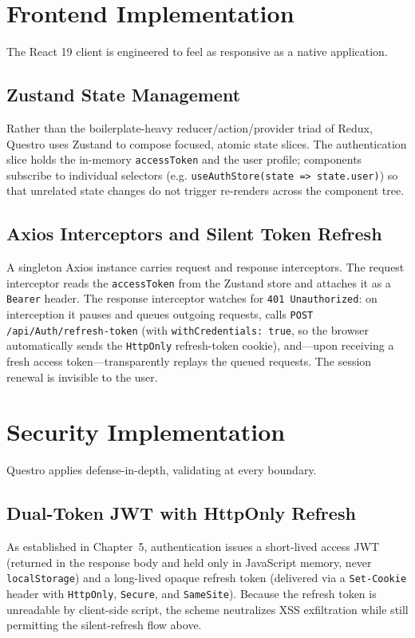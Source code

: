 \section{Frontend Implementation}
The React 19 client is engineered to feel as responsive as a native application.

\subsection{Zustand State Management}
Rather than the boilerplate-heavy reducer/action/provider triad of Redux, Questro uses Zustand to compose focused, atomic state slices. The authentication slice holds the in-memory \texttt{accessToken} and the user profile; components subscribe to individual selectors (e.g. \texttt{useAuthStore(state => state.user)}) so that unrelated state changes do not trigger re-renders across the component tree.

\subsection{Axios Interceptors and Silent Token Refresh}
A singleton Axios instance carries request and response interceptors. The request interceptor reads the \texttt{accessToken} from the Zustand store and attaches it as a \texttt{Bearer} header. The response interceptor watches for \texttt{401 Unauthorized}: on interception it pauses and queues outgoing requests, calls \texttt{POST /api/Auth/refresh-token} (with \texttt{withCredentials: true}, so the browser automatically sends the \texttt{HttpOnly} refresh-token cookie), and---upon receiving a fresh access token---transparently replays the queued requests. The session renewal is invisible to the user.

\section{Security Implementation}
\label{sec:security_impl}
Questro applies defense-in-depth, validating at every boundary.

\subsection{Dual-Token JWT with HttpOnly Refresh}
As established in Chapter~5, authentication issues a short-lived access JWT \cite{rfc7519} (returned in the response body and held only in JavaScript memory, never \texttt{localStorage}) and a long-lived opaque refresh token (delivered via a \texttt{Set-Cookie} header with \texttt{HttpOnly}, \texttt{Secure}, and \texttt{SameSite}). Because the refresh token is unreadable by client-side script, the scheme neutralizes XSS exfiltration while still permitting the silent-refresh flow above.

